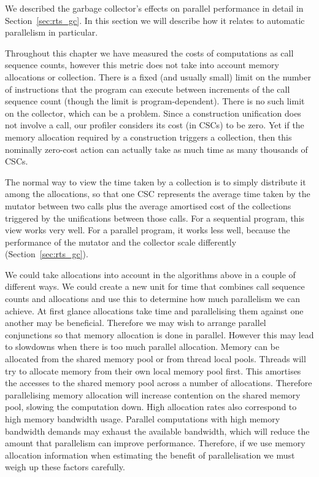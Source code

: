 We described the garbage collector's effects on parallel performance in
detail in Section~\ref{sec:rts_gc}.
In this section we will describe how it relates to automatic parallelism in
particular.

Throughout this chapter we have measured the costs of computations as call
sequence counts,
however this metric does not take into account memory allocations or
collection.
There is a fixed (and usually small) limit
on the number of instructions that the program can execute
between increments of the call sequence count
(though the limit is program-dependent).
There is no such limit on the collector, which can be a problem.
Since a construction unification does not involve a call,
our profiler considers its cost (in CSCs) to be zero.
Yet if the memory allocation required by a construction
triggers a collection,
then this nominally zero-cost action can actually take as much time
as many thousands of CSCs.

The normal way to view the time taken by a collection
is to simply distribute it among the allocations,
so that one CSC represents the average time taken
by the mutator between two calls
plus the average amortised cost of the collections
triggered by the unifications between those calls.
For a sequential program, this view works very well.
For a parallel program, it works less well,
because the performance of the mutator and the collector scale differently
(Section~\ref{sec:rts_gc}).

We could take allocations into account in the algorithms above in a couple
of different ways.
We could create a new unit for time that combines call sequence counts
and allocations and use this to determine how much parallelism we can
achieve.
At first glance allocations take time and parallelising them against one
another may be beneficial.
Therefore we may wish to arrange parallel conjunctions so that memory
allocation is done in parallel.
However this may lead to slowdowns when there is too much parallel
allocation.
Memory can be allocated from the shared memory pool or from thread local
pools.
Threads will try to allocate memory from their own local memory pool first.
This amortises the accesses to the shared memory pool across a number of
allocations.
Therefore parallelising memory allocation will increase contention on the
shared memory pool, slowing the computation down.
High allocation rates also correspond to high memory bandwidth usage.
Parallel computations with high memory bandwidth demands may exhaust the
available bandwidth,
which will reduce the amount that parallelism can improve performance.
Therefore,
if we use memory allocation information when estimating the benefit of
parallelisation we must weigh up these factors carefully.


